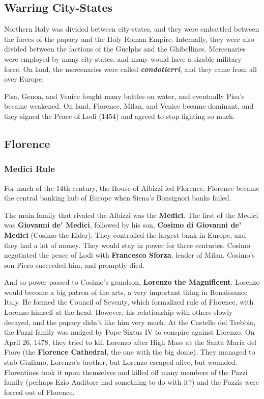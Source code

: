 \subsection*{Warring City-States}

Northern Italy was divided between city-states,
and they were embattled between the forces of the papacy and the Holy Roman Empire.
Internally, they were also divided between the factions of the Guelphs and the Ghibellines.
Mercenaries were employed by many city-states, and many would have a sizable military force.
On land, the mercenaries were called \textit{\textbf{condotierri}}, and they came from all over Europe.

Pisa, Genoa, and Venice fought many battles on water, and eventually Pisa's became weakened.
On land, Florence, Milan, and Venice became dominant,
and they signed the Peace of Lodi (1454) and agreed to stop fighting so much.

\subsection*{Florence}

\subsubsection*{Medici Rule}

For much of the 14th century, the House of Albizzi led Florence.
Florence became the central banking hub of Europe when Siena's Bonsignori banks failed.

The main family that rivaled the Albizzi was the \textbf{Medici}.
The first of the Medici was \textbf{Giovanni de' Medici},
followed by his son, \textbf{Cosimo di Giovanni de' Medici} (Cosimo the Elder).
They controlled the largest bank in Europe, and they had a lot of money.
They would stay in power for three centuries.
Cosimo negotiated the peace of Lodi with \textbf{Francesco Sforza}, leader of Milan.
Cosimo's son Piero succeeded him, and promptly died.

And so power passed to Cosimo's grandson, \textbf{Lorenzo the Magnificent}.
Lorenzo would become a big patron of the arts, a very important thing in Renaissance Italy.
He formed the Council of Seventy, which formalized rule of Florence, with Lorenzo himself at the head.
However, his relationship with others slowly decayed, and the papacy didn't like him very much.
At the Castello del Trebbio, the Pazzi family was nudged by Pope Sixtus IV to conspire against Lorenzo.
On April 26, 1478, they tried to kill Lorenzo after High Mass at the Santa Maria del Fiore
(the \textbf{Florence Cathedral}, the one with the big dome).
They managed to stab Giuliano, Lorenzo's brother, but Lorenzo escaped alive, but wounded.
Florentines took it upon themselves and killed off many members of the Pazzi family
(perhaps Ezio Auditore had something to do with it?)
and the Pazzis were forced out of Florence.

